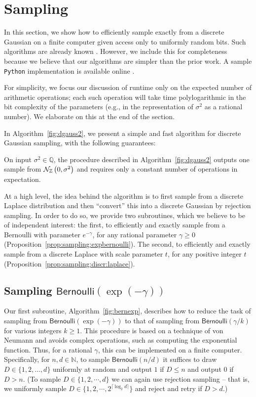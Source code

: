 \documentclass{jpc}
\newcommand{\dgausss}[2]{{\discN\left(#1,#2\right)}}
\newcommand{\dgauss}[1]{\dgausss{0}{#1}}
\newcommand{\bern}{\mathsf{Bernoulli}}
\begin{document}
\section{Sampling}
\label{sec:sampling}

In this section, we show how to efficiently sample exactly from a discrete Gaussian on a finite computer given access only to uniformly random bits. Such algorithms are already known \citep{Karney16,DuFW20}. However, we include this for completeness because we believe that our algorithms are simpler than the prior work. A sample \texttt{Python} implementation is available online \citep{DGaussGithub}.

For simplicity, we focus our discussion of runtime only on the expected number of arithmetic operations; each such operation will take time polylogarithmic in the bit complexity of the parameters (e.g., in the representation of $\sigma^2$ as a rational number). We elaborate on this at the end of the section. 

In Algorithm~\ref{fig:dgauss2}, we present a simple and fast algorithm for discrete Gaussian sampling, with the following guarantees:
\begin{thm}
  \label{theo:sampling:discrete:gaussian}
  On input $\sigma^2\in\mathbb{Q}$, the procedure described in Algorithm~\ref{fig:dgauss2} outputs one sample from $\dgauss{\sigma^2}$ and requires only a constant number of  operations in expectation.
\end{thm}

At a high level, the idea behind the algorithm is to first sample from a discrete Laplace distribution and then ``convert'' this into a discrete Gaussian by rejection sampling. In order to do so, we provide two subroutines, which we believe to be of independent interest: the first, to efficiently and exactly sample from a Bernoulli with parameter $e^{-\gamma}$, for any rational parameter $\gamma \geq 0$ (Proposition~\ref{prop:sampling:expbernoulli}). The second, to efficiently and exactly sample from a discrete Laplace with scale parameter $t$, for any positive integer $t$ (Proposition~\ref{prop:sampling:discr:laplace}).

\subsection{Sampling $\bern(\exp(-\gamma))$}

Our first subroutine, Algorithm~\ref{fig:bernexp}, describes how to reduce the task of sampling from  $\bern(\exp(-\gamma))$ to that of sampling from $\bern(\gamma/k)$ for various integers $k \ge 1$. 
This procedure is based on a technique of von Neumann \citep{vonNeumann51,Forsythe72} and avoids complex operations, such as computing the exponential function. Thus, for a rational $\gamma$, this can be implemented on a finite computer. Specifically, for $n,d \in \mathbb{N}$, to sample $\bern(n/d)$ it suffices to draw $D \in \{1,2,\dots,d\}$ uniformly at random and output $1$ if $D \le n$ and output $0$ if $D > n$. (To sample $D \in \{1,2,\cdots,d\}$ we can again use rejection sampling -- that is, we uniformly sample $D \in \{1,2,\cdots,2^{\lceil \log_2 d \rceil}\}$ and reject and retry if $D>d$.)
\end{document}
